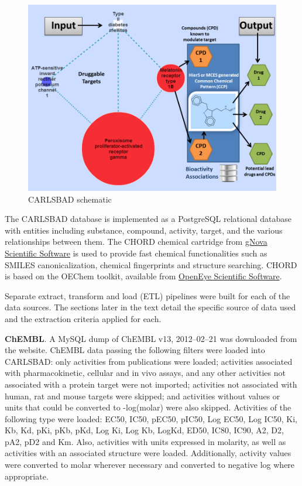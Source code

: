 \begin{figure}
    \centering
    \includegraphics[width=\textwidth]{figures/carlsbad/CB1_Screenshots.png}
    \caption{CARLSBAD schematic}
    \label{fig:cb_schematic}
\end{figure}

The CARLSBAD database is implemented as a PostgreSQL relational database with entities including substance, compound, activity, target, and the various relationships between them. The CHORD chemical cartridge from \href{https://www.gnova.com/}{gNova Scientific Software} is used to provide fast chemical functionalities such as SMILES canonicalization\cite{Weininger1989-kh}, chemical fingerprints and structure searching. CHORD is based on the OEChem toolkit, available from \href{https://www.eyesopen.com/}{OpenEye Scientific Software}.

Separate extract, transform and load (ETL) pipelines were built for each of the data sources. The sections later in the text detail the specific source of data used and the extraction criteria applied for each.

\textbf{ChEMBL}. A MySQL dump of ChEMBL v13, 2012–02–21 was downloaded from the website. ChEMBL data passing the following filters were loaded into CARLSBAD: only activities from publications were loaded; activities associated with pharmacokinetic, cellular and in vivo assays, and any other activities not associated with a protein target were not imported; activities not associated with human, rat and mouse targets were skipped; and activities without values or units that could be converted to -log(molar) were also skipped. Activities of the following type were loaded: EC50, IC50, pEC50, pIC50, Log EC50, Log IC50, Ki, Kb, Kd, pKi, pKb, pKd, Log Ki, Log Kb, LogKd, ED50, IC80, IC90, A2, D2, pA2, pD2 and Km. Also, activities with units expressed in molarity, as well as activities with an associated structure were loaded. Additionally, activity values were converted to molar wherever necessary and converted to negative log where appropriate.

